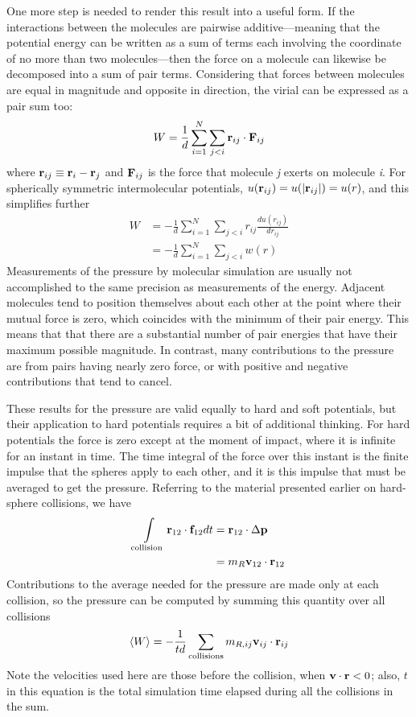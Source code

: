 \documentclass[]{article}
\begin{document}
One more step is needed to render this result into a useful form. If the
interactions between the molecules are pairwise additive---meaning that
the potential energy can be written as a sum of terms each involving the
coordinate of no more than two molecules---then the force on a molecule
can likewise be decomposed into a sum of pair terms. Considering that
forces between molecules are equal in magnitude and opposite in
direction, the virial can be expressed as a pair sum too:
\[W = \frac{1}{d}\sum\limits_{i = 1}^N {\sum\limits_{j < i} {{{\bf{r}}_{ij}} \cdot {{\bf{F}}_{ij}}} } \]
where ${{\bf{r}}_{ij}} \equiv {{\bf{r}}_i} - {{\bf{r}}_j}$ and ${\bf F}_{ij}$ is the force that molecule
\emph{j} exerts on molecule \emph{i}. For spherically symmetric
intermolecular potentials, $u({{\bf{r}}_{ij}}) = u(|{{\bf{r}}_{ij}}|) = u(r)$, and this simplifies further
\begin{align*}
W &=  - \frac{1}{d}\sum\limits_{i = 1}^N {\sum\limits_{j < i} {{r_{ij}}\frac{{du({r_{ij}})}}{{d{r_{ij}}}}} } \\
 &=  - \frac{1}{d}\sum\limits_{i = 1}^N {\sum\limits_{j < i} {w(r)} } 
\end{align*}
Measurements of the pressure by molecular simulation are usually not
accomplished to the same precision as measurements of the energy.
Adjacent molecules tend to position themselves about each other at the
point where their mutual force is zero, which coincides with the minimum
of their pair energy. This means that that there are a substantial
number of pair energies that have their maximum possible magnitude. In
contrast, many contributions to the pressure are from pairs having
nearly zero force, or with positive and negative contributions that tend
to cancel.

These results for the pressure are valid equally to hard and soft
potentials, but their application to hard potentials requires a bit of
additional thinking. For hard
potentials the force is zero except at the moment of impact, where it is
infinite for an instant in time. The time integral of the force over
this instant is the finite impulse that the spheres apply to each other,
and it is this impulse that must be averaged to get the pressure.
Referring to the material presented earlier on hard-sphere collisions,
we have
\begin{align*}
\int\limits_{\rm{collision}} {{{\bf{r}}_{12}} \cdot {{\bf{f}}_{12}}dt}  &= {{\bf{r}}_{12}} \cdot \Delta {\bf{p}}\\
 &= {m_R}{{\bf{v}}_{12}} \cdot {{\bf{r}}_{12}}
\end{align*}
Contributions to the average needed for the pressure are made only at
each collision, so the pressure can be computed by summing this quantity
over all collisions
\[\left\langle W \right\rangle  =  - \frac{1}{{td}}\sum\limits_{\rm collisions} {{m_{R,ij}}{{\bf{v}}_{ij}} \cdot {{\bf{r}}_{ij}}} \]
Note the velocities used here are those before the collision, when ${\bf{v}} \cdot {\bf{r}} < 0$;
also, $t$ in this equation is the total simulation time elapsed
during all the collisions in the sum.
\end{document}
